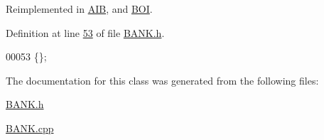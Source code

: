 Reimplemented in \hyperlink{class_a_i_b_afe4e3c7b481bf87437968dde2cc75882_afe4e3c7b481bf87437968dde2cc75882}{A\+IB}, and \hyperlink{class_b_o_i_a663906e9a59ffa970fb928746c01e8af_a663906e9a59ffa970fb928746c01e8af}{B\+OI}.



Definition at line \hyperlink{_b_a_n_k_8h_source_l00053}{53} of file \hyperlink{_b_a_n_k_8h_source}{B\+A\+N\+K.\+h}.


\begin{DoxyCode}
00053 \{\};
\end{DoxyCode}


The documentation for this class was generated from the following files\+:\begin{DoxyCompactItemize}
\item 
\hyperlink{_b_a_n_k_8h}{B\+A\+N\+K.\+h}\item 
\hyperlink{_b_a_n_k_8cpp}{B\+A\+N\+K.\+cpp}\end{DoxyCompactItemize}
